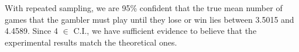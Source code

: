 \documentclass[a4paper,12pt]{article}
\theoremstyle{definition}
\begin{document}
With repeated sampling, we are 95\% confident that the true mean number of games that the gambler must play until they lose or win lies 
between 3.5015 and 4.4589. Since 4 $\in$ C.I., we have sufficient evidence to believe that the experimental results match the theoretical 
ones.

\clearpage







\end{document}
